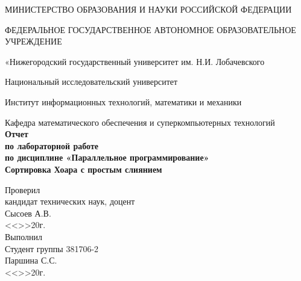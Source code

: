 \documentclass[a4paper,final]{report}
\begin{document}
	\begin{titlepage}
	
		\begin{center} 
	
			\par МИНИСТЕРСТВО ОБРАЗОВАНИЯ И НАУКИ РОССИЙСКОЙ ФЕДЕРАЦИИ
			\par ФЕДЕРАЛЬНОЕ ГОСУДАРСТВЕННОЕ АВТОНОМНОЕ ОБРАЗОВАТЕЛЬНОЕ УЧРЕЖДЕНИЕ 
			\par «Нижегородский государственный университет им. Н.И. Лобачевского\\[0.2cm]
			\par Национальный исследовательский университет\\[0.1cm]
			\par Институт информационных технологий, математики и механики \\[0.1cm]
			\par Кафедра математического обеспечения и суперкомпьютерных технологий\\[2.5cm]		

			{\huge \bfseries Отчет \\[0.1cm]
				\Large \mdseries по лабораторной работе \\[0,1cm]
				\Large \mdseries по дисциплине «Параллельное программирование» \\[1cm]
				\Large \bfseries Сортировка Хоара с простым слиянием}\\[3cm]
		\end{center}
    
		\begin{flushright} \large
			{Проверил} \\[0.1cm]
			{кандидат технических наук, доцент}\\[0.1cm]
			{\underline{\hspace{2,35in}} Сысоев А.В.}\\[0.1cm]
			{<<\underline{\hspace{0,25in}}>>\underline{\hspace{2,55in}}20\underline{\hspace{0,3in}}г.} \\[0.1cm]
			{Выполнил} \\[0.1cm]
			{Студент группы 381706-2} \\[0.1cm]
			{\underline{\hspace{2,1in}} Паршина С.С.} \\[0.1cm]
			{<<\underline{\hspace{0,25in}}>>\underline{\hspace{2,55in}}20\underline{\hspace{0,3in}}г.} \\[3cm]
		\end{flushright}
		
	\end{titlepage}
	
\end{document}
